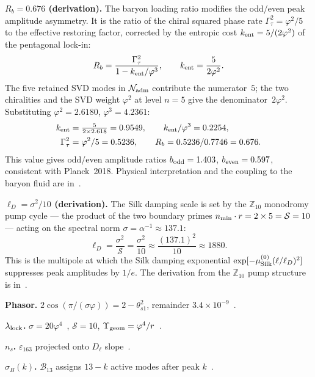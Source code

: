 \documentclass[twocolumn,10pt]{article}
\newcommand{\vp}{\varphi}
\newcommand{\Gt}{\Gamma_\tau}
\newcommand{\Nadm}{\mathcal{N}_{\rm adm}}
\newcommand{\Bone}{\mathcal{B}_{13}}
\newcommand{\mustr}{\mu_{\rm Silk}^{(0)}}
\newcommand{\llock}{\lambda_{\rm lock}}
\begin{document}
\medskip
\noindent\textbf{$R_b=0.676$ (derivation).}
The baryon loading ratio modifies the odd/even peak amplitude
asymmetry. It is the ratio of the chiral squared phase rate
$\Gt^2=\vp^2/5$ to the effective restoring factor, corrected by
the entropic cost $k_{\rm ent}=5/(2\vp^2)$ of the pentagonal
lock-in:
\begin{equation*}
  R_b = \frac{\Gt^2}{1 - k_{\rm ent}/\vp^3},
  \qquad
  k_{\rm ent} = \frac{5}{2\vp^2}.
\end{equation*}
The five retained SVD modes in $\Nadm$ contribute the numerator~$5$;
the two chiralities and the SVD weight $\vp^2$ at level $n=5$ give
the denominator~$2\vp^2$.
Substituting $\vp^2=2.6180$, $\vp^3=4.2361$:
\begin{align*}
  k_{\rm ent} &= \tfrac{5}{2\times2.618} = 0.9549,\qquad
  k_{\rm ent}/\vp^3 = 0.2254,\\
  \Gt^2 &= \vp^2/5 = 0.5236,\qquad
  R_b = 0.5236/0.7746 = 0.676.
\end{align*}
This value gives odd/even amplitude ratios $b_{\rm odd}=1.403$,
$b_{\rm even}=0.597$, consistent with Planck~2018. Physical
interpretation and the coupling to the baryon fluid are in~\cite{CamP12}.

\medskip
\noindent\textbf{$\ell_D=\sigma^2/10$ (derivation).}
The Silk damping scale is set by the $\mathbb{Z}_{10}$ monodromy
pump cycle — the product of the two boundary primes
$n_{\rm min}\cdot r = 2\times5 = \mathcal{S}=10$ — acting on the
spectral norm $\sigma=\alpha^{-1}\approx137.1$:
\begin{equation*}
  \ell_D = \frac{\sigma^2}{\mathcal{S}} = \frac{\sigma^2}{10}
  \approx \frac{(137.1)^2}{10} \approx 1880.
\end{equation*}
This is the multipole at which the Silk damping exponential
$\exp[-\mustr(\ell/\ell_D)^2]$ suppresses peak amplitudes by $1/e$.
The derivation from the $\mathbb{Z}_{10}$ pump structure is in~\cite{CamP05}.

\medskip
\noindent\textbf{Phasor.}
$2\cos(\pi/(\sigma\vp))=2-\theta_{s1}^2$, remainder
$3.4\times10^{-9}$~\cite{CamKer163}.

\noindent\textbf{$\llock$.}
$\sigma=20\vp^4$~\cite{CamP09}, $\mathcal{S}=10$,
$\Upsilon_{\rm geom}=\vp^4/r$~\cite{CamKer163}.

\noindent\textbf{$n_s$.}
$\varepsilon_{163}$ projected onto $D_\ell$ slope~\cite{CamKer163}.

\noindent\textbf{$\sigma_B(k)$.}
$\Bone$ assigns $13-k$ active modes after peak $k$~\cite{CamKer163}.
\end{document}
